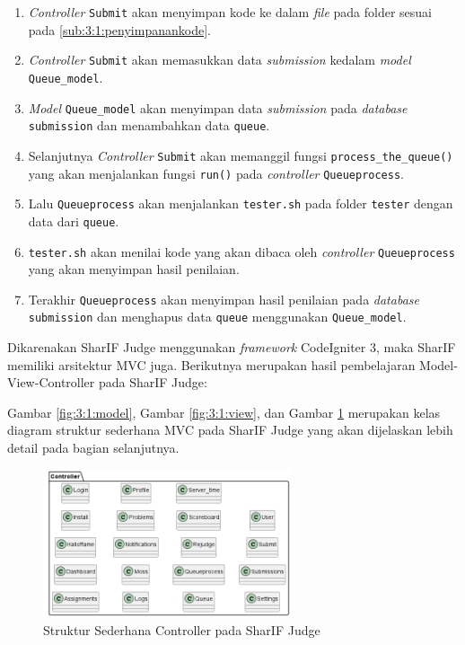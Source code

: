 \documentclass[a4paper,twoside]{article}
\begin{document}
\begin{enumerate}
\begin{itemize}
		            \begin{enumerate}
			            \item \textit{Controller} \verb|Submit| akan menyimpan kode ke dalam \textit{file} pada folder sesuai pada \ref{sub:3:1:penyimpanankode}.
			            \item \textit{Controller} \verb|Submit| akan memasukkan data \textit{submission} kedalam \textit{model} \verb|Queue_model|.
			            \item \textit{Model} \verb|Queue_model| akan menyimpan data \textit{submission} pada \textit{database} \verb|submission| dan menambahkan data \verb|queue|.
			            \item Selanjutnya \textit{Controller} \verb|Submit| akan memanggil fungsi \verb|process_the_queue()| yang akan menjalankan fungsi \verb|run()| pada \textit{controller} \verb|Queueprocess|.
			            \item Lalu \verb|Queueprocess| akan menjalankan \verb|tester.sh| pada folder \verb|tester| dengan data dari \verb|queue|.
			            \item \verb|tester.sh| akan menilai kode yang akan dibaca oleh \textit{controller} \verb|Queueprocess| yang akan menyimpan hasil penilaian.
			            \item Terakhir \verb|Queueprocess| akan menyimpan hasil penilaian pada \textit{database} \verb|submission| dan menghapus data \verb|queue| menggunakan \verb|Queue_model|.
		            \end{enumerate}

	      \end{itemize}

	      Dikarenakan SharIF Judge menggunakan \textit{framework} CodeIgniter 3, maka SharIF memiliki arsitektur MVC juga. Berikutnya merupakan hasil pembelajaran Model-View-Controller pada SharIF Judge:

	      Gambar \ref{fig:3:1:model}, Gambar \ref{fig:3:1:view}, dan Gambar \ref{fig:3:1:controller} merupakan kelas diagram struktur sederhana MVC pada SharIF Judge yang akan dijelaskan lebih detail pada bagian selanjutnya.

	      \begin{figure}[H]
		      \centering
		      \includegraphics[width=0.65\textwidth]{analisis/class/class_controller.png}
		      \caption{Struktur Sederhana Controller pada SharIF Judge}
		      \label{fig:3:1:controller}
	      \end{figure}


\end{enumerate}
\end{document}
